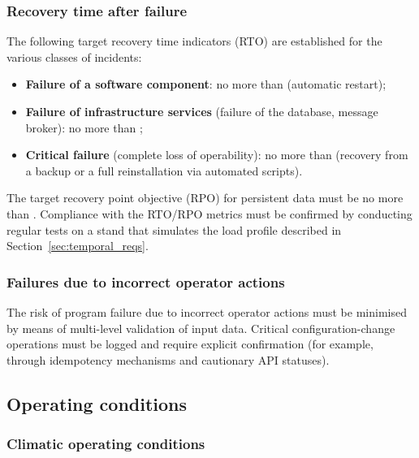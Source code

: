 \documentclass[12pt,a4paper]{extarticle}
\begin{document}
\subsubsection{Recovery time after failure}

\begin{hseExample}
The following target recovery time indicators (RTO) are established for the various classes of incidents:
\begin{itemize}[nosep, leftmargin=1.25cm]
    \item \textbf{Failure of a software component}: no more than  (automatic restart);
    \item \textbf{Failure of infrastructure services} (failure of the database, message broker): no more than ;
    \item \textbf{Critical failure} (complete loss of operability): no more than  (recovery from a backup or a full reinstallation via automated scripts).
\end{itemize}

The target recovery point objective (RPO) for persistent data must be no more than . Compliance with the RTO/RPO metrics must be confirmed by conducting regular tests on a stand that simulates the load profile described in Section~\ref{sec:temporal_reqs}.
\end{hseExample}

\subsubsection{Failures due to incorrect operator actions}

\begin{hseExample}
The risk of program failure due to incorrect operator actions must be minimised by means of multi-level validation of input data. Critical configuration-change operations must be logged and require explicit confirmation (for example, through idempotency mechanisms and cautionary API statuses).
\end{hseExample}

\clearpage

\subsection{Operating conditions}

\subsubsection{Climatic operating conditions}
\end{document}
